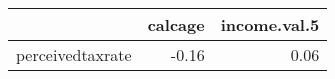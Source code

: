 \begin{table}[ht]
\centering
\begin{tabular}{rrr}
  \hline
 & calcage & income.val.5 \\ 
  \hline
perceivedtaxrate & -0.16 & 0.06 \\ 
   \hline
\end{tabular}
\end{table}
